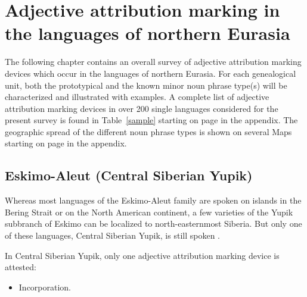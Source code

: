 
\chapter[The languages of northern Eurasia]{Adjective attribution marking in the languages of northern Eurasia}

The following chapter contains an overall survey of adjective attribution marking devices which occur in the languages of northern Eurasia. For each genealogical unit, both the prototypical and the known minor noun phrase type(s) will be characterized and illustrated with examples. A complete list of adjective attribution marking devices in over 200 single languages considered for the present survey is found in Table~\ref{sample} starting on page \pageref{sample} in the appendix. The geographic spread of the different noun phrase types is shown on several Maps starting on page \pageref{WorldMap} in the appendix.

\section{Eskimo-Aleut (Central Siberian Yupik)}
Whereas most languages of the Eskimo-Aleut family are spoken on islands in the Bering Strait or on the North American continent, a few varieties of the Yupik subbranch of Eskimo can be localized to north-easternmost Siberia. But only one of these languages, Central Siberian Yupik, is still spoken \cite[224]{salminen2007}.

In Central Siberian Yupik, only one adjective attribution marking device is attested:
\begin{itemize}
\item Incorporation.
\end{itemize}

